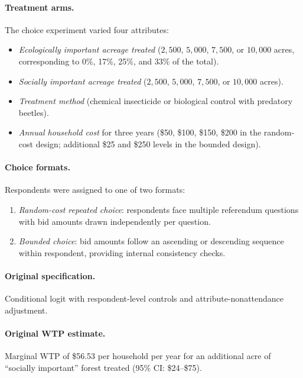 \documentclass[12pt]{article}
\begin{document}
\paragraph{Treatment arms.} The choice experiment varied four attributes:
\begin{itemize}[noitemsep]
    \item \textit{Ecologically important acreage treated} ($2{,}500$, $5{,}000$, $7{,}500$, or $10{,}000$ acres, corresponding to 0\%, 17\%, 25\%, and 33\% of the total).
    \item \textit{Socially important acreage treated} ($2{,}500$, $5{,}000$, $7{,}500$, or $10{,}000$ acres).
    \item \textit{Treatment method} (chemical insecticide or biological control with predatory beetles).
    \item \textit{Annual household cost} for three years (\$50, \$100, \$150, \$200 in the random-cost design; additional \$25 and \$250 levels in the bounded design).
\end{itemize}

\paragraph{Choice formats.} Respondents were assigned to one of two formats:
\begin{enumerate}[noitemsep]
    \item \textit{Random-cost repeated choice}: respondents face multiple referendum questions with bid amounts drawn independently per question.
    \item \textit{Bounded choice}: bid amounts follow an ascending or descending sequence within respondent, providing internal consistency checks.
\end{enumerate}

\paragraph{Original specification.} Conditional logit with respondent-level controls and attribute-nonattendance adjustment.

\paragraph{Original WTP estimate.} Marginal WTP of \$56.53 per household per year for an additional acre of ``socially important'' forest treated (95\% CI: \$24--\$75).

\end{document}
